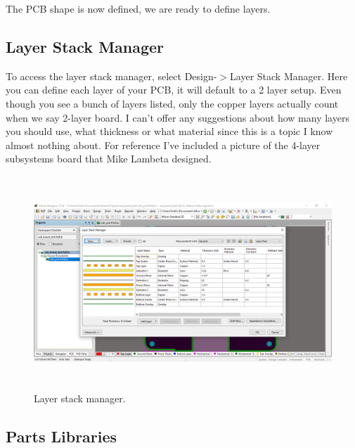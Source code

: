 \documentclass{article}
\begin{document}
	The PCB shape is now defined, we are ready to define layers.
	
	\subsection{Layer Stack Manager}
	To access the layer stack manager, select Design-$>$Layer Stack Manager. Here you can define each layer of your PCB, it will default to a 2 layer setup. Even though you see a bunch of layers listed, only the copper layers actually count when we say 2-layer board. I can't offer any suggestions about how many layers you should use, what thickness or what material since this is a topic I know almost nothing about. For reference I've included a picture of the 4-layer subsystems board that Mike Lambeta designed.
	
	\begin{figure}[H]	
		\centering
		\includegraphics[width=16cm, height=8cm]{layer_stack.png}
		\caption{Layer stack manager.}
		\label{fig 6}
	\end{figure}
	
	\subsection{Parts Libraries}
\end{document}
